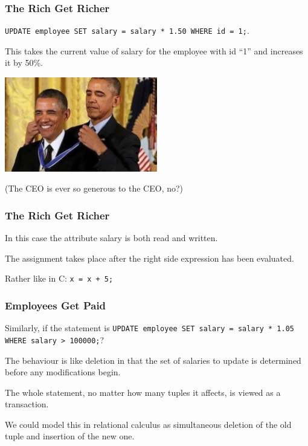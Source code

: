 \begin{frame}
\frametitle{The Rich Get Richer}

\texttt{UPDATE employee SET salary = salary * 1.50 WHERE id = 1;}. 

This takes the current value of salary for the employee with id ``1'' and increases it by 50\%.

\begin{center}
	\includegraphics[width=0.5\textwidth]{images/medal.jpg}
\end{center}

(The CEO is ever so generous to the CEO, no?)

\end{frame}



\begin{frame}
\frametitle{The Rich Get Richer}

In this case the attribute salary is both read and written. 

The assignment takes place after the right side expression has been evaluated.

Rather like in C: \texttt{x = x + 5;}

\end{frame}



\begin{frame}
\frametitle{Employees Get Paid}

Similarly, if the statement is \texttt{UPDATE employee SET salary = salary * 1.05 WHERE salary > 100000;}?

The behaviour is like deletion in that the set of salaries to update is determined before any modifications begin. 

The whole statement, no matter how many tuples it affects, is viewed as a transaction. 

We could model this in relational calculus as simultaneous deletion of the old tuple and insertion of the new one. 


\end{frame}









